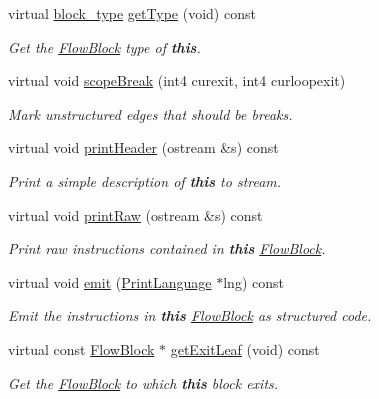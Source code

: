 \begin{DoxyCompactItemize}
virtual \mbox{\hyperlink{class_flow_block_a70df78390870fcdd51e31426ba6a193e}{block\+\_\+type}} \mbox{\hyperlink{class_block_multi_goto_a9fd5bfdaa3202a1cd604213c2be88bf2}{get\+Type}} (void) const
\begin{DoxyCompactList}\small\item\em Get the \mbox{\hyperlink{class_flow_block}{Flow\+Block}} type of {\bfseries{this}}. \end{DoxyCompactList}\item 
virtual void \mbox{\hyperlink{class_block_multi_goto_a1957286b0a3a4a2d280caae3c1f19cc7}{scope\+Break}} (int4 curexit, int4 curloopexit)
\begin{DoxyCompactList}\small\item\em Mark unstructured edges that should be {\itshape breaks}. \end{DoxyCompactList}\item 
virtual void \mbox{\hyperlink{class_block_multi_goto_a0886201717ed839e30e4e8e2b39d33d7}{print\+Header}} (ostream \&s) const
\begin{DoxyCompactList}\small\item\em Print a simple description of {\bfseries{this}} to stream. \end{DoxyCompactList}\item 
virtual void \mbox{\hyperlink{class_block_multi_goto_a56b9c331488b4bf0c0f01cc583192630}{print\+Raw}} (ostream \&s) const
\begin{DoxyCompactList}\small\item\em Print raw instructions contained in {\bfseries{this}} \mbox{\hyperlink{class_flow_block}{Flow\+Block}}. \end{DoxyCompactList}\item 
virtual void \mbox{\hyperlink{class_block_multi_goto_a8eee38e26a13873ceaff6d37b46eaafd}{emit}} (\mbox{\hyperlink{class_print_language}{Print\+Language}} $\ast$lng) const
\begin{DoxyCompactList}\small\item\em Emit the instructions in {\bfseries{this}} \mbox{\hyperlink{class_flow_block}{Flow\+Block}} as structured code. \end{DoxyCompactList}\item 
virtual const \mbox{\hyperlink{class_flow_block}{Flow\+Block}} $\ast$ \mbox{\hyperlink{class_block_multi_goto_a54ba810882911521ff2ca84b6458228a}{get\+Exit\+Leaf}} (void) const
\begin{DoxyCompactList}\small\item\em Get the \mbox{\hyperlink{class_flow_block}{Flow\+Block}} to which {\bfseries{this}} block exits. \end{DoxyCompactList}\item 

\end{DoxyCompactItemize}
